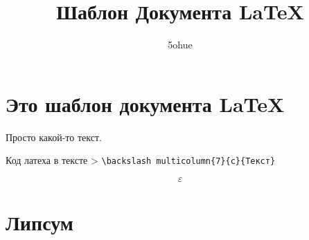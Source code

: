 \documentclass[a4paper,12pt]{article}%
\title{Шаблон Документа \LaTeX}
\author{5ohue}
\renewcommand{\epsilon}{\ensuremath{\varepsilon}}
\begin{document}
	
\thispagestyle{fancy}

\maketitle

\tableofcontents

\section{Это шаблон документа \LaTeX}

Просто какой-то текст.

Код латеха в тексте
> \verb!\backslash multicolumn{7}{c}{Текст}!

\begin{equation}
  \epsilon
\end{equation}

\section{Липсум}
\lipsum[1-15]
\end{document}
